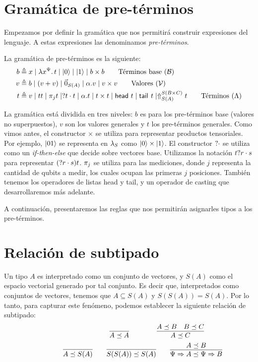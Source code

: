 \section{Gramática de pre-términos}

Empezamos por definir la gramática que nos permitirá construir expresiones del lenguaje. A estas expresiones las denominamos \textit{pre-términos}.

La gramática de pre-términos es la siguiente:
\begin{align*}
	b & \triangleq x \mid \abstr{\vrbl{x}{\Psi}}{t} \mid \ket{0} \mid \ket{1} \mid b \times b \tag*{Términos base \( (\mathcal{B}) \)}                                                                       \\
	v & \triangleq b \mid (v + v) \mid \nullvec{A} \mid \alpha . v \mid v \times v \tag*{Valores \( (\mathcal{V}) \)}                                                                                  \\
	t & \triangleq v \mid \app{t}{t} \mid \proj{j}{t} \mid \ifte{}{t}{t} \mid \alpha . t \mid t \times t \mid \head{t} \mid \tail{t} \mid \cast{S(A)}{S(B \times C)} t \tag*{Términos \( (\Lambda) \)}
\end{align*}

La gramática está dividida en tres niveles: \( b \) es para los pre-términos base (valores no superpuestos), \( v \) son los valores generales y \( t \) los pre-términos generales.
Como vimos antes, el constructor \( \times \) se utiliza para representar productos tensoriales. Por ejemplo, \( \ket{01} \) se representa en \( \lambda_S \) como \( \ket{0} \times \ket{1} \). El constructor \( ?  \cdot \) se utiliza como un \textit{if-then-else} que decide sobre vectores base. Utilizamos la notación \( t? r \cdot s \) para representar \( (? r \cdot s) t \).
\( \pi_{j} \) se utiliza para las mediciones, donde \( j \) representa la cantidad de qubits a medir, los cuales ocupan las primeras \( j \) posiciones. También tenemos los operadores de listas \textsf{head} y \textsf{tail}, y un operador de casting que desarrollaremos más adelante.

A continuación, presentaremos las reglas que nos permitirán asignarles tipos a los pre-términos.

\section{Relación de subtipado}
Un tipo \( A \) es interpretado como un conjunto de vectores, y \( S(A) \) como el espacio vectorial generado por tal conjunto. Es decir que, interpretados como conjuntos de vectores, tenemos que \( A \subseteq S(A) \) y \( S(S(A)) = S(A) \). Por lo tanto, para capturar este fenómeno, podemos establecer la siguiente relación de subtipado:
\[
	\quad\quad\quad\quad\quad\quad\quad\quad
	\infer{A \preceq A}{}
	\quad\quad\quad\quad
	\infer{A \preceq C}{A \preceq B & B \preceq C}
\]
\[
	\quad\quad\quad\quad
	\infer{A \preceq S(A)}{}
	\quad\quad
	\infer{S(S(A)) \preceq S(A)}{}
	\quad\quad
	\infer{\Psi \Rightarrow A \preceq \Psi \Rightarrow B}{A \preceq B}
\]

